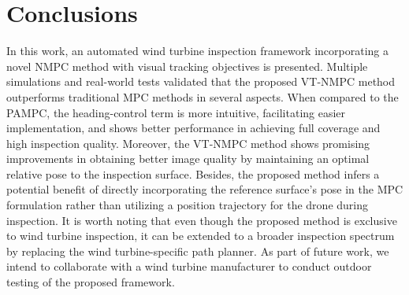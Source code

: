 \section{Conclusions}
\label{sec:conclusion}




In this work, an automated wind turbine inspection framework incorporating a novel NMPC method with visual tracking objectives is presented. Multiple simulations and real-world tests validated that the proposed VT-NMPC method outperforms traditional MPC methods in several aspects. When compared to the PAMPC, the heading-control term is more intuitive, facilitating easier implementation, and shows better performance in achieving full coverage and high inspection quality. Moreover, the VT-NMPC method shows promising improvements in obtaining better image quality by maintaining an optimal relative pose to the inspection surface. Besides, the proposed method infers a potential benefit of directly incorporating the reference surface's pose in the MPC formulation rather than utilizing a position trajectory for the drone during inspection. It is worth noting that even though the proposed method is exclusive to wind turbine inspection, it can be extended to a broader inspection spectrum by replacing the wind turbine-specific path planner.
As part of future work, we intend to collaborate with a wind turbine manufacturer to conduct outdoor testing of the proposed framework.


